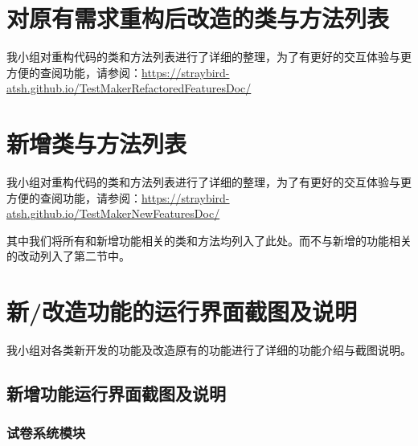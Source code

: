 \documentclass[hyperref, a4paper]{ctexart}
\begin{document}
\pagebreak

\hypertarget{ux5bf9ux539fux6709ux9700ux6c42ux91cdux6784ux540eux6539ux9020ux7684ux7c7bux4e0eux65b9ux6cd5ux5217ux8868}{%
\section{对原有需求重构后改造的类与方法列表}\label{ux5bf9ux539fux6709ux9700ux6c42ux91cdux6784ux540eux6539ux9020ux7684ux7c7bux4e0eux65b9ux6cd5ux5217ux8868}}

我小组对重构代码的类和方法列表进行了详细的整理，为了有更好的交互体验与更方便的查阅功能，请参阅：\url{https://straybird-atsh.github.io/TestMakerRefactoredFeaturesDoc/}

\pagebreak

\hypertarget{ux65b0ux589eux7c7bux4e0eux65b9ux6cd5ux5217ux8868}{%
\section{新增类与方法列表}\label{ux65b0ux589eux7c7bux4e0eux65b9ux6cd5ux5217ux8868}}

我小组对重构代码的类和方法列表进行了详细的整理，为了有更好的交互体验与更方便的查阅功能，请参阅：\url{https://straybird-atsh.github.io/TestMakerNewFeaturesDoc/}

其中我们将所有和新增功能相关的类和方法均列入了此处。而不与新增的功能相关的改动列入了第二节中。

\pagebreak

\hypertarget{ux65b0ux6539ux9020ux529fux80fdux7684ux8fd0ux884cux754cux9762ux622aux56feux53caux8bf4ux660e}{%
\section{新/改造功能的运行界面截图及说明}\label{ux65b0ux6539ux9020ux529fux80fdux7684ux8fd0ux884cux754cux9762ux622aux56feux53caux8bf4ux660e}}

我小组对各类新开发的功能及改造原有的功能进行了详细的功能介绍与截图说明。

\hypertarget{ux65b0ux589eux529fux80fdux8fd0ux884cux754cux9762ux622aux56feux53caux8bf4ux660e}{%
\subsection{新增功能运行界面截图及说明}\label{ux65b0ux589eux529fux80fdux8fd0ux884cux754cux9762ux622aux56feux53caux8bf4ux660e}}

\hypertarget{ux8bd5ux5377ux7cfbux7edfux6a21ux5757}{%
\subsubsection{试卷系统模块}\label{ux8bd5ux5377ux7cfbux7edfux6a21ux5757}}
\end{document}
